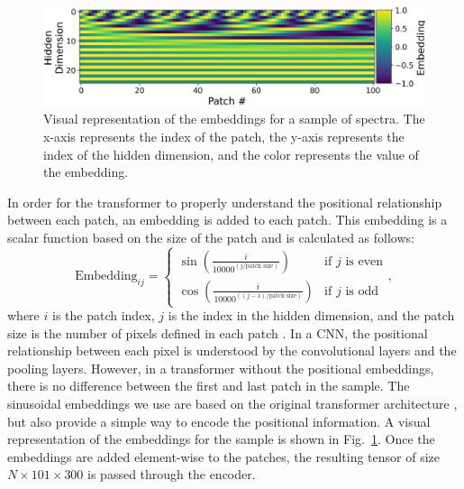 \begin{figure}[t]
    \centering
    \includegraphics[width=\linewidth]{figures/embeddings_new.png}
    \caption[Positional Embeddings for ViT]{Visual representation of the embeddings for a sample of spectra. The x-axis represents the 
    index of the patch, the y-axis represents the index of the hidden dimension, and the color represents 
the value of the embedding.}
    \label{fig:embedding}
\end{figure}

In order for the transformer to properly understand the positional relationship between each patch, an embedding 
is added to each patch. This embedding is a scalar function based on the size 
of the patch and is calculated as follows: 
\begin{equation}
    \text{Embedding}_{ij} = \begin{cases} \sin\left(\frac{i}{10000^{(j / \text{patch size})}}\right) & \text{if } j \text{ is even} \\
    \cos\left(\frac{i}{10000^{((j - 1) / \text{patch size})}}\right) & \text{if } j \text{ is odd}\end{cases},
\end{equation}
where $i$ is the patch index, $j$ is the index in the hidden dimension, and 
the patch size is the number of pixels defined in each patch \parencite{vaswani2017}. 
In a CNN, the positional relationship between each pixel is understood by the convolutional layers
and the pooling layers. However, in a transformer without the positional embeddings, there is no difference between 
the first and last patch in the sample. The sinusoidal embeddings we use are based on the original transformer architecture \parencite{vaswani2017}, but also provide a simple way to encode the positional information. A visual 
representation of the embeddings for the sample is shown in Fig.~\ref{fig:embedding}. Once the 
embeddings are added element-wise to the patches, the resulting tensor of size $N\times101\times300$ is passed through the encoder. 



